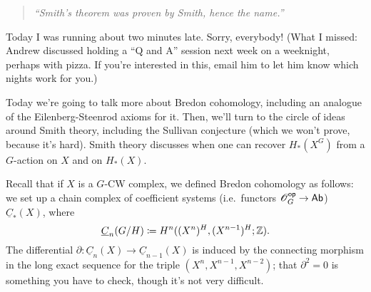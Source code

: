 
\begin{quote}\textit{
	``Smith's theorem was proven by Smith, hence the name.''
}\end{quote}
Today I was running about two minutes late. Sorry, everybody! (What I missed: Andrew discussed holding a ``Q and
A'' session next week on a weeknight, perhaps with pizza. If you're interested in this, email him to let him know
which nights work for you.)

Today we're going to talk more about Bredon cohomology, including an analogue of the Eilenberg-Steenrod axioms for
it. Then, we'll turn to the circle of ideas around Smith theory, including the Sullivan conjecture (which we won't
prove, because it's hard). Smith theory discusses when one can recover $H_*(X^G)$ from a $G$-action on $X$ and on
$H_*(X)$.

Recall that if $X$ is a $G$-CW complex, we defined Bredon cohomology as follows: we set up a chain complex of
coefficient systems (i.e.\ functors $\mathscr O_G^{\mathsf{op}}\to\mathsf{Ab}$) $\underline C_*(X)$, where
\[\underline C_n(G/H)\coloneqq H^n((X^n)^H, (X^{n-1})^H; \mathbb Z).\]
The differential $\partial:\underline C_n(X)\to\underline C_{n-1}(X)$ is induced by the connecting morphism in the
long exact sequence for the triple $(X^n, X^{n-1}, X^{n-2})$; that $\partial^2 = 0$ is something you have to check,
though it's not very difficult.

